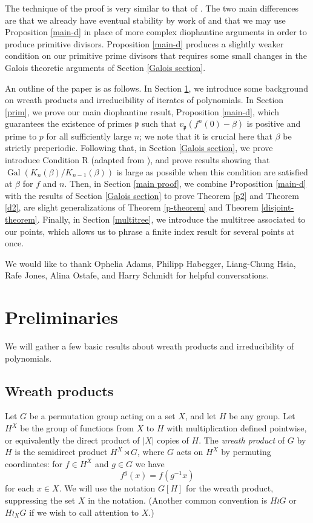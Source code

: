\documentclass[11pt]{amsart}
\theoremstyle{definition}
\theoremstyle{definition}
\numberwithin{thm}{section}
\numberwithin{equation}{thm}
\newcommand{\fp}{\ensuremath{{\mathfrak{p}}}}
\DeclareMathOperator{\Gal}{Gal}
\begin{document}
The technique of the proof is very similar to that of \cite{BT2, Uni1}.
The two main differences are that we already have eventual stability
by work of \cite{RafeAlon} and that we may use Proposition \ref{main-d} in
place of more complex diophantine arguments in order to produce
primitive divisors. Proposition \ref{main-d} produces a slightly
weaker condition on our primitive prime divisors that requires some
small changes in the Galois theoretic arguments of Section \ref{Galois
  section}.  

An outline of the paper is as follows.  In Section \ref{wreath}, we
introduce some background on wreath products and irreducibility of
iterates of polynomials.  In Section \ref{prim}, we prove our main
diophantine result, Proposition \ref{main-d}, which guarantees the
existence of primes $\fp$ such that $v_\fp(f^n(0) - \beta)$ is
positive and prime to $p$ for all sufficiently large $n$; we note that
it is crucial here that $\beta$ be strictly preperiodic.  Following
that, in Section \ref{Galois section}, we prove introduce Condition R
(adapted from \cite{BT2}), and prove results showing that
$\Gal(K_n(\beta) / K_{n-1}(\beta))$ is large as possible when this
condition are satisfied at $\beta$ for $f$ and $n$.  Then, in Section
\ref{main proof}, we combine Proposition \ref{main-d} with the results
of Section \ref{Galois section} to prove Theorem \ref{p2} and Theorem
\ref{d2}, are slight generalizations of Theorem \ref{p-theorem} and
Theorem \ref{disjoint-theorem}.  Finally, in Section \ref{multitree},
we introduce the multitree associated to our points, which allows us
to phrase a finite index result for several points at once.  


\medskip

  We would like to thank Ophelia
Adams, Philipp Habegger, Liang-Chung Hsia, Rafe Jones, Alina Ostafe, and
Harry Schmidt for helpful conversations.  


\section{Preliminaries}\label{wreath}

We will gather a few basic results about wreath products and
irreducibility of polynomials.

\subsection{Wreath products}\label{wreath2}
Let $G$ be a permutation group acting on a set $X$, 
and let $H$ be any group. Let $H^X$ be the group of functions from $X$ to $H$ 
with multiplication defined pointwise, or equivalently the direct product of $|X|$ copies of $H$. 
The {\em wreath product} of $G$ by $H$ is the semidirect 
product $H^X\rtimes G$, where $G$ acts on $H^X$ 
by permuting coordinates: for $f\in H^X$ and $g\in G$ we have \[f^g(x)=f(g^{-1}x)\]
for each $x\in X$. We will use the notation $G[H]$ for the wreath product, suppressing the set $X$ 
in the notation. (Another common convention is $H\wr G$ or $H\wr_X G$ if we wish to call attention to $X$.)
\end{document}
